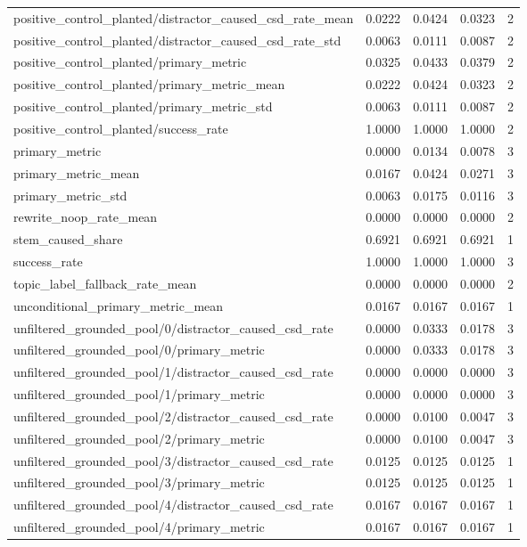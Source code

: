 \begin{table}[h]
\begin{tabular}{lrrrr}
positive_control_planted/distractor_caused_csd_rate_mean & 0.0222 & 0.0424 & 0.0323 & 2 \\
positive_control_planted/distractor_caused_csd_rate_std & 0.0063 & 0.0111 & 0.0087 & 2 \\
positive_control_planted/primary_metric & 0.0325 & 0.0433 & 0.0379 & 2 \\
positive_control_planted/primary_metric_mean & 0.0222 & 0.0424 & 0.0323 & 2 \\
positive_control_planted/primary_metric_std & 0.0063 & 0.0111 & 0.0087 & 2 \\
positive_control_planted/success_rate & 1.0000 & 1.0000 & 1.0000 & 2 \\
primary_metric & 0.0000 & 0.0134 & 0.0078 & 3 \\
primary_metric_mean & 0.0167 & 0.0424 & 0.0271 & 3 \\
primary_metric_std & 0.0063 & 0.0175 & 0.0116 & 3 \\
rewrite_noop_rate_mean & 0.0000 & 0.0000 & 0.0000 & 2 \\
stem_caused_share & 0.6921 & 0.6921 & 0.6921 & 1 \\
success_rate & 1.0000 & 1.0000 & 1.0000 & 3 \\
topic_label_fallback_rate_mean & 0.0000 & 0.0000 & 0.0000 & 2 \\
unconditional_primary_metric_mean & 0.0167 & 0.0167 & 0.0167 & 1 \\
unfiltered_grounded_pool/0/distractor_caused_csd_rate & 0.0000 & 0.0333 & 0.0178 & 3 \\
unfiltered_grounded_pool/0/primary_metric & 0.0000 & 0.0333 & 0.0178 & 3 \\
unfiltered_grounded_pool/1/distractor_caused_csd_rate & 0.0000 & 0.0000 & 0.0000 & 3 \\
unfiltered_grounded_pool/1/primary_metric & 0.0000 & 0.0000 & 0.0000 & 3 \\
unfiltered_grounded_pool/2/distractor_caused_csd_rate & 0.0000 & 0.0100 & 0.0047 & 3 \\
unfiltered_grounded_pool/2/primary_metric & 0.0000 & 0.0100 & 0.0047 & 3 \\
unfiltered_grounded_pool/3/distractor_caused_csd_rate & 0.0125 & 0.0125 & 0.0125 & 1 \\
unfiltered_grounded_pool/3/primary_metric & 0.0125 & 0.0125 & 0.0125 & 1 \\
unfiltered_grounded_pool/4/distractor_caused_csd_rate & 0.0167 & 0.0167 & 0.0167 & 1 \\
unfiltered_grounded_pool/4/primary_metric & 0.0167 & 0.0167 & 0.0167 & 1 \\

\end{tabular}
\end{table}
